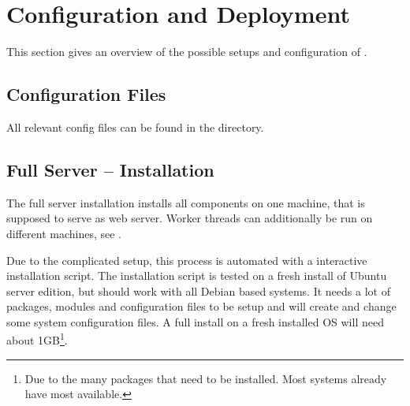 \section{Configuration and Deployment}
\label{sec:deployment}

This section gives an overview of the possible setups and configuration of \spl.

\subsection{Configuration Files}

All relevant config files can be found in the  directory.

\begin{itemize}
\end{itemize}




\subsection{Full Server -- Installation}
\label{sec:serverinstall}

The full server installation installs all components on one machine, that is supposed to serve as web server.
Worker threads can additionally be run on different machines, see .

Due to the complicated setup, this process is automated with a interactive installation script.
The installation script is tested on a fresh install of Ubuntu server edition, but should work with all Debian based systems.
It needs a lot of packages, modules and configuration files to be setup and will create and change some system configuration files.
A full install on a fresh installed OS will need about 1GB\footnote{Due to the many packages that need to be installed. Most systems already have most available.}.

